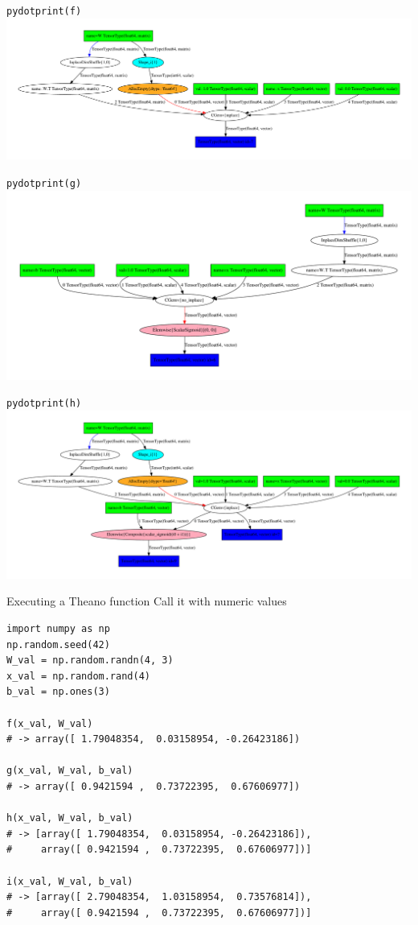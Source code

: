 \documentclass[a4paper,9pt]{beamer}
\begin{document}
\begin{frame}{\tt pydotprint(f)}
    \includegraphics[width=\textwidth]{pydotprint_f.pdf}
\end{frame}
\begin{frame}{\tt pydotprint(g)}
    \includegraphics[width=\textwidth]{pydotprint_g.pdf}
\end{frame}
\begin{frame}{\tt pydotprint(h)}
    \includegraphics[width=\textwidth]{pydotprint_h.pdf}
\end{frame}

\begin{frame}[fragile]{Executing a Theano function}
  Call it with numeric values
\small
  \begin{verbatim}
import numpy as np
np.random.seed(42)
W_val = np.random.randn(4, 3)
x_val = np.random.rand(4)
b_val = np.ones(3)

f(x_val, W_val)
# -> array([ 1.79048354,  0.03158954, -0.26423186])

g(x_val, W_val, b_val)
# -> array([ 0.9421594 ,  0.73722395,  0.67606977])

h(x_val, W_val, b_val)
# -> [array([ 1.79048354,  0.03158954, -0.26423186]),
#     array([ 0.9421594 ,  0.73722395,  0.67606977])]

i(x_val, W_val, b_val)
# -> [array([ 2.79048354,  1.03158954,  0.73576814]),
#     array([ 0.9421594 ,  0.73722395,  0.67606977])]
  \end{verbatim}
\end{frame}
\end{document}
